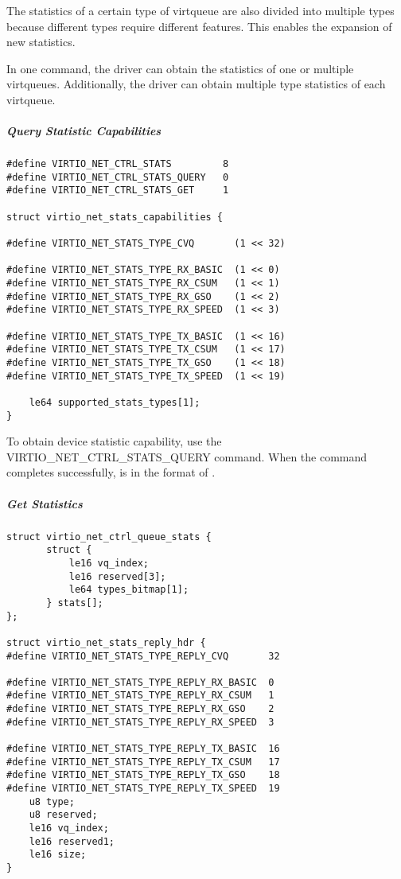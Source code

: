 The statistics of a certain type of virtqueue are also divided into multiple types
because different types require different features. This enables the expansion
of new statistics.

In one command, the driver can obtain the statistics of one or multiple virtqueues.
Additionally, the driver can obtain multiple type statistics of each virtqueue.

\subparagraph{Query Statistic Capabilities}\label{sec:Device Types / Network Device / Device Operation / Control Virtqueue / Device Statistics / Query Statistic Capabilities}

\begin{lstlisting}
#define VIRTIO_NET_CTRL_STATS         8
#define VIRTIO_NET_CTRL_STATS_QUERY   0
#define VIRTIO_NET_CTRL_STATS_GET     1

struct virtio_net_stats_capabilities {

#define VIRTIO_NET_STATS_TYPE_CVQ       (1 << 32)

#define VIRTIO_NET_STATS_TYPE_RX_BASIC  (1 << 0)
#define VIRTIO_NET_STATS_TYPE_RX_CSUM   (1 << 1)
#define VIRTIO_NET_STATS_TYPE_RX_GSO    (1 << 2)
#define VIRTIO_NET_STATS_TYPE_RX_SPEED  (1 << 3)

#define VIRTIO_NET_STATS_TYPE_TX_BASIC  (1 << 16)
#define VIRTIO_NET_STATS_TYPE_TX_CSUM   (1 << 17)
#define VIRTIO_NET_STATS_TYPE_TX_GSO    (1 << 18)
#define VIRTIO_NET_STATS_TYPE_TX_SPEED  (1 << 19)

    le64 supported_stats_types[1];
}
\end{lstlisting}

To obtain device statistic capability, use the VIRTIO_NET_CTRL_STATS_QUERY
command. When the command completes successfully, 
is in the format of .

\subparagraph{Get Statistics}\label{sec:Device Types / Network Device / Device Operation / Control Virtqueue / Device Statistics / Get Statistics}

\begin{lstlisting}
struct virtio_net_ctrl_queue_stats {
       struct {
           le16 vq_index;
           le16 reserved[3];
           le64 types_bitmap[1];
       } stats[];
};

struct virtio_net_stats_reply_hdr {
#define VIRTIO_NET_STATS_TYPE_REPLY_CVQ       32

#define VIRTIO_NET_STATS_TYPE_REPLY_RX_BASIC  0
#define VIRTIO_NET_STATS_TYPE_REPLY_RX_CSUM   1
#define VIRTIO_NET_STATS_TYPE_REPLY_RX_GSO    2
#define VIRTIO_NET_STATS_TYPE_REPLY_RX_SPEED  3

#define VIRTIO_NET_STATS_TYPE_REPLY_TX_BASIC  16
#define VIRTIO_NET_STATS_TYPE_REPLY_TX_CSUM   17
#define VIRTIO_NET_STATS_TYPE_REPLY_TX_GSO    18
#define VIRTIO_NET_STATS_TYPE_REPLY_TX_SPEED  19
    u8 type;
    u8 reserved;
    le16 vq_index;
    le16 reserved1;
    le16 size;
}
\end{lstlisting}

